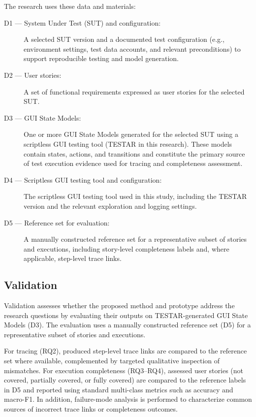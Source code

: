 \documentclass{ou-report-vaf}
\begin{document}
The research uses these data and materials:

\begin{description}
    \item[D1 --- System Under Test (SUT) and configuration:]
    A selected SUT version and a documented test configuration (e.g., environment settings, test data accounts, and relevant preconditions) to support reproducible testing and model generation.

    \item[D2 --- User stories:]
    A set of functional requirements expressed as user stories for the selected SUT.

    \item[D3 --- GUI State Models:]
    One or more GUI State Models generated for the selected SUT using a scriptless GUI testing tool (TESTAR in this research). These models contain states, actions, and transitions and constitute the primary source of test execution evidence used for tracing and completeness assessment.

    \item[D4 --- Scriptless GUI testing tool and configuration:]
    The scriptless GUI testing tool used in this study, including the TESTAR version and the relevant exploration and logging settings.

    \item[D5 --- Reference set for evaluation:]
    A manually constructed reference set for a representative subset of stories and executions, including story-level completeness labels and, where applicable, step-level trace links.
\end{description}

\subsection{Validation}
\label{subsec:validation}

Validation assesses whether the proposed method and prototype address the research questions by evaluating their outputs on TESTAR-generated GUI State Models (D3). The evaluation uses a manually constructed reference set (D5) for a representative subset of stories and executions.

For tracing (RQ2), produced step-level trace links are compared to the reference set where available, complemented by targeted qualitative inspection of mismatches. For execution completeness (RQ3--RQ4), assessed user stories (not covered, partially covered, or fully covered) are compared to the reference labels in D5 and reported using standard multi-class metrics such as accuracy and macro-F1. In addition, failure-mode analysis is performed to characterize common sources of incorrect trace links or completeness outcomes.
\end{document}
